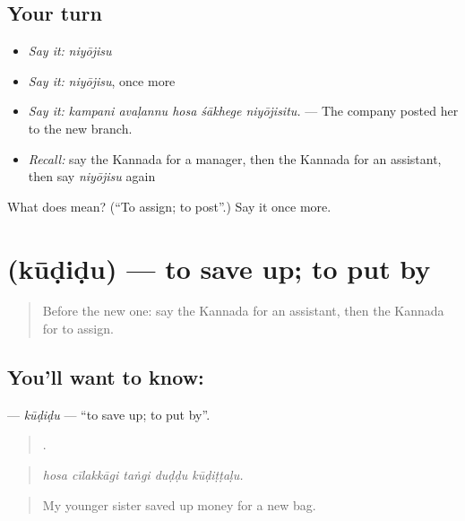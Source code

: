 \subsection*{Your turn}
\begin{itemize}
\raggedright
  \item \emph{Say it:} \emph{niyōjisu}
  \item \emph{Say it:} \emph{niyōjisu}, once more
  \item \emph{Say it:} \emph{kampani avaḷannu hosa śākhege niyōjisitu.} — The company posted her to the new branch.
  \item \emph{Recall:} say the Kannada for a manager, then the Kannada for an assistant, then say \emph{niyōjisu} again
\end{itemize}

\begin{tcolorbox}[breakable,colback=teal!4,colframe=teal!35!black,title={Before you move on}]
What does  mean? (\textquotedblleft{}To assign; to post\textquotedblright{}.) Say it once more.
\end{tcolorbox}
\section[\texorpdfstring{\kn{ಕೂಡಿಡು} (kūḍiḍu)}{ಕೂಡಿಡು (kūḍiḍu)}]{ (kūḍiḍu) — to save up; to put by}

\label{lesson:KA-C519-kudidu}



\begin{quote}
Before the new one: say the Kannada for an assistant, then the Kannada for to assign.
\end{quote}

\subsection*{You'll want to know: }
\textbf{} — \emph{kūḍiḍu} — \textquotedblleft{}to save up; to put by\textquotedblright{}.

\begin{quote}
    .
\end{quote}

\begin{quote}
\emph{hosa cīlakkāgi taṅgi duḍḍu kūḍiṭṭaḷu.}
\end{quote}

\begin{quote}
My younger sister saved up money for a new bag.
\end{quote}

